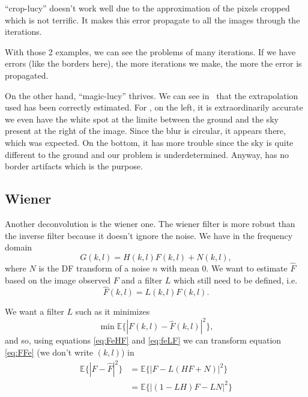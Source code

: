 ``crop-lucy'' doesn't work well due to the approximation of the pixels
cropped which is not terrific.
It makes this error propagate to all the images through the iterations.

With those 2 examples, we can see the problems of many iterations.
If we have errors (like the borders here), the more iterations
we make, the more the error is propagated.

On the other hand, ``magic-lucy'' thrives.
We can see in~
that the extrapolation used has been correctly estimated.
For ,
on the left, it is extraordinarily accurate we even have the white
spot at the limite between the ground and the sky present at the right of the image.
Since the blur is circular, it appears there, which was expected.
On the bottom, it has more trouble since the sky is quite different to the
ground and our problem is underdetermined.
Anyway,  has no border artifacts which
is the purpose.

\subsection{Wiener}
\label{subsec:Wiener}
 Another deconvolution is the wiener one. The wiener filter is more robust than the inverse filter because it doesn't ignore the noise. We have in the frequency domain
\begin{equation}
G(k,l) = H(k,l)F(k,l) + N(k,l),
\label{eq:FeHF}
\end{equation} 
 where $N$ is the DF transform of a noise $n$ with mean $0$. We want to estimate $\hat{F}$ based on the image observed $F$ and a filter $L$ which still need to be defined, i.e. 
 \begin{equation}
\hat{F}(k,l) = L(k,l)F(k,l).
 \label{eq:feLF}
 \end{equation}

We want a filter $L$ such as it minimizes 
\begin{equation}
\min \mathbb{E}\{|F(k,l) - \hat{F}(k,l)|^2\},
\label{eq:FFe}
\end{equation}
and so, using equations \eqref{eq:FeHF} and \eqref{eq:feLF} we can transform equation \eqref{eq:FFe} (we don't write $(k,l)$) in 
\begin{align*}
\mathbb{E}\{|F - \hat{F}|^2\} &= \mathbb{E}\{|F - L(HF+N)|^2\}\\
	&= \mathbb{E}\{|(1-LH)F - LN|^2\}
\end{align*}

